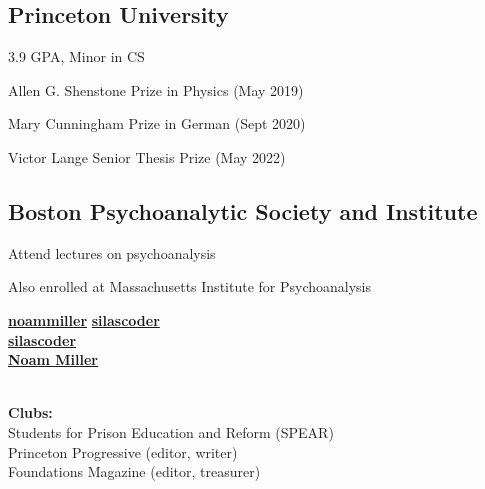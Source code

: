 \documentclass[a4paper]{MagicalCV}
\begin{document}
\lastupdated


\begin{minipage}[t]{0.33\textwidth} 


\subsection{Princeton University}
\vspace{\topsep}
\begin{tightemize}
\item 3.9 GPA, Minor in CS
\item Allen G. Shenstone Prize in Physics (May 2019)
\item Mary Cunningham Prize in German (Sept 2020)
\item Victor Lange Senior Thesis Prize (May 2022)
\end{tightemize}
\hspace{0.3cm}


\subsection{Boston Psychoanalytic Society and Institute}
\vspace{\topsep}
\begin{tightemize}
\item Attend lectures on psychoanalysis
\item Also enrolled at Massachusetts Institute for Psychoanalysis
\end{tightemize}
\sectionsep


 \href{https://github.com/noammiller}{\bf noammiller}
 \href{https://github.com/silascoder}{\bf silascoder} \\
 \href{https://salsa.debian.org/silascoder}{\bf silascoder} \\
 \href{https://www.linkedin.com/in/noam-miller-8853a4154}{\bf Noam Miller}
\sectionsep

 \\
\textbf{Clubs:} \\
Students for Prison Education and Reform (SPEAR)\\
Princeton Progressive (editor, writer)\\
Foundations Magazine (editor, treasurer)\\


\end{minipage}
\end{document}
